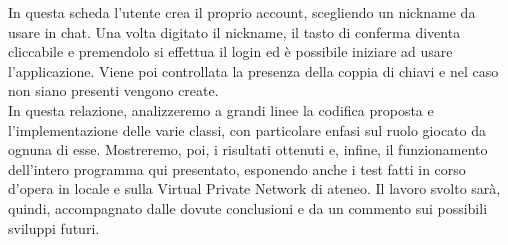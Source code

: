 In questa scheda l'utente crea il proprio account, scegliendo un nickname da usare in chat.
Una volta digitato il nickname, il tasto di conferma diventa cliccabile e premendolo si effettua
il login ed è possibile iniziare ad usare l'applicazione.
Viene poi controllata la presenza della coppia di chiavi e nel caso non siano presenti vengono create.
\\

In questa relazione, analizzeremo a grandi linee la codifica proposta e l'implementazione
delle varie classi, con particolare enfasi sul ruolo giocato da ognuna di esse.
Mostreremo, poi, i risultati ottenuti e, infine,
il funzionamento dell'intero programma qui presentato,
esponendo anche i test fatti in corso d'opera
in locale e sulla Virtual Private Network di ateneo.
Il lavoro svolto sarà, quindi, accompagnato dalle dovute conclusioni e
da un commento sui possibili sviluppi futuri.